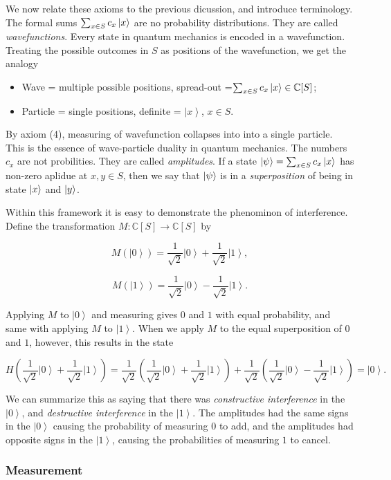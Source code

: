 \documentclass{article}
\theoremstyle{definition}
\newcommand{\CC}{\mathbb{C}}
\newcommand{\0}{\left|0\right>}
\newcommand{\1}{\left|1\right>}
\numberwithin{figure}{section}
\begin{document}
We now relate these axioms to the previous dicussion, and introduce terminology. The formal sums $\sum_{x\in S}c_x\ket{x}$ are no probability distributions. They are called \textit{wavefunctions}. Every state in quantum mechanics is encoded in a wavefunction. Treating the possible outcomes in $S$ as positions of the wavefunction, we get the analogy

\begin{itemize}
\item Wave = multiple possible positions, spread-out =$\sum_{x\in S}c_x\ket{x}\in \CC[S]$;
\item Particle = single positions, definite = $\left|x\right>$, $x\in S$.
\end{itemize}

By axiom (4), measuring of wavefunction collapses into into a single particle. This is the essence of wave-particle duality in quantum mechanics. The numbers $c_x$ are not probilities. They are called \textit{amplitudes}. If a state $\ket{\psi}=\sum_{x\in S}c_x \ket{x}$ has non-zero aplidue at $x,y\in S$, then we say that $\ket{\psi}$ is in a \textit{superposition} of being in state $\ket{x}$ and $\ket{y}$.

Within this framework it is easy to demonstrate the phenominon of interference. Define the transformation $M: \CC[S]\to \CC[S]$ by

$$M(\0)=\frac{1}{\sqrt{2}}\0+\frac{1}{\sqrt{2}}\1,$$

$$M(\1)=\frac{1}{\sqrt{2}}\0-\frac{1}{\sqrt{2}}\1.$$

Applying $M$ to $\0$ and measuring gives $0$ and $1$ with equal probability, and same with applying $M$ to $\1$. When we apply $M$ to the equal superposition of $0$ and $1$, however, this results in the state

$$H\left(\frac{1}{\sqrt{2}}\0+\frac{1}{\sqrt{2}}\1\right)=\frac{1}{\sqrt{2}}\left(\frac{1}{\sqrt{2}}\0+\frac{1}{\sqrt{2}}\1\right)+\frac{1}{\sqrt{2}}\left(\frac{1}{\sqrt{2}}\0-\frac{1}{\sqrt{2}}\1\right)=\0.$$

We can summarize this as saying that there was \textit{constructive interference} in the $\0$, and \textit{destructive interference} in the $\1$. The amplitudes had the same signs in the $\0$ causing the probability of measuring $0$ to add, and the amplitudes had opposite signs in the $\1$, causing the probabilities of measuring $1$ to cancel. 

\subsubsection{Measurement}
\end{document}

